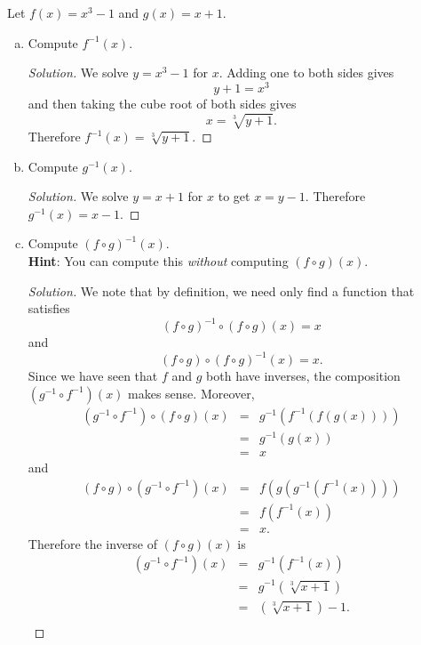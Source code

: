 \documentclass[12pt]{amsart}
\begin{document}
\begin{thm}[20 Points]\label{ex4}
  Let $f(x) = x^3 - 1$ and $g(x) = x + 1$.
  \begin{enumerate}[(a)]
  \item
    Compute $f^{-1}(x)$.
    \begin{proof}[Solution]
      We solve $y = x^3 - 1$ for $x$. Adding one to both sides gives
      $$y + 1 = x^3$$
      and then taking the cube root of both sides gives
      $$x = \sqrt[3]{y + 1}.$$
      Therefore $f^{-1}(x) = \sqrt[3]{y + 1}$.
    \end{proof}
  \item
    Compute $g^{-1}(x)$.
    \begin{proof}[Solution]
      We solve $y = x + 1$ for $x$ to get $x = y - 1$.
      Therefore $g^{-1}(x) = x - 1$.
    \end{proof}
  \item
    Compute $(f \circ g)^{-1}(x)$.\\
    {\bf Hint}: You can compute this {\it without} computing $(f \circ g)(x)$.
    \begin{proof}[Solution]
      We note that by definition, we need only find a function that satisfies
      $$(f \circ g)^{-1} \circ (f \circ g)(x) = x$$
      and
      $$(f \circ g) \circ (f \circ g)^{-1}(x) = x.$$
      Since we have seen that $f$ and $g$ both have inverses, the composition $\left(g^{-1} \circ f^{-1}\right)(x)$ makes sense.
      Moreover,
      \begin{eqnarray*}
        \left(g^{-1} \circ f^{-1}\right) \circ (f \circ g)(x) &=&
        g^{-1}\left( f^{-1} \left(f\left( g(x)\right)\right)\right)\\
        &=& g^{-1}\left(g(x)\right)\\
        &=& x
      \end{eqnarray*}
      and
      \begin{eqnarray*}
        (f \circ g) \circ \left(g^{-1} \circ f^{-1}\right)(x) &=&
        f \left( g\left( g^{-1}\left( f^{-1}(x)\right)\right)\right)\\
        &=& f\left(f^{-1}(x)\right)\\
        &=& x.
      \end{eqnarray*}
      Therefore the inverse of $(f \circ g)(x)$ is
      \begin{eqnarray*}
        \left(g^{-1} \circ f^{-1}\right)(x) &=& g^{-1}\left(f^{-1}(x)\right)\\
        &=& g^{-1}\left(\sqrt[3]{x + 1}\right)\\
        &=& \left(\sqrt[3]{x + 1}\right) - 1.\\
      \end{eqnarray*}
    \end{proof}
  \end{enumerate}
\end{thm}
\end{document}
